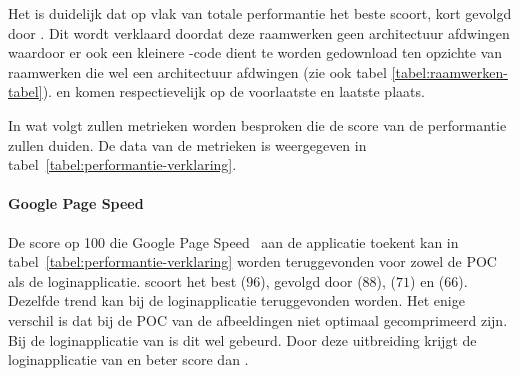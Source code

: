 Het is duidelijk dat op vlak van totale performantie \jqm{} het beste scoort, kort gevolgd door \lungo{}.
Dit wordt verklaard doordat deze raamwerken geen architectuur afdwingen waardoor er ook een kleinere \js{}-code dient te worden gedownload ten opzichte van raamwerken die wel een architectuur afdwingen (zie ook tabel \ref{tabel:raamwerken-tabel}).
\kendo{} en \st{} komen respectievelijk op de voorlaatste en laatste plaats.

In wat volgt zullen metrieken worden besproken die de score van de performantie zullen duiden.
De data van de metrieken is weergegeven in tabel~\ref{tabel:performantie-verklaring}.

\begin{table}[H]
\centering
{}
\caption{Metrieken gebruikt bij de verklaring van performantiecriterium voor \st{}~(\sta), \kendo{}~(\kendoa), \jqm{}~(\jqma) en \lungo{}~(\lungoa).}
\label{tabel:performantie-verklaring}
\end{table}

\paragraph{Google Page Speed}
De score op 100 die Google Page Speed~\cite{Morgan2011} aan de applicatie toekent kan in tabel~\ref{tabel:performantie-verklaring} worden teruggevonden voor zowel de POC als de loginapplicatie.
\st{} scoort het best ($96$),  gevolgd door \lungo{} ($88$),  \jqm{}($71$) en \kendo{}($66$).
Dezelfde trend kan bij de loginapplicatie teruggevonden worden.
Het enige verschil is dat bij de POC van \kendo{} de afbeeldingen niet optimaal gecomprimeerd zijn.
Bij de loginapplicatie van \kendo{} is dit wel gebeurd.
Door deze uitbreiding krijgt de loginapplicatie van \kendo{} en beter score dan \jqm{}.

